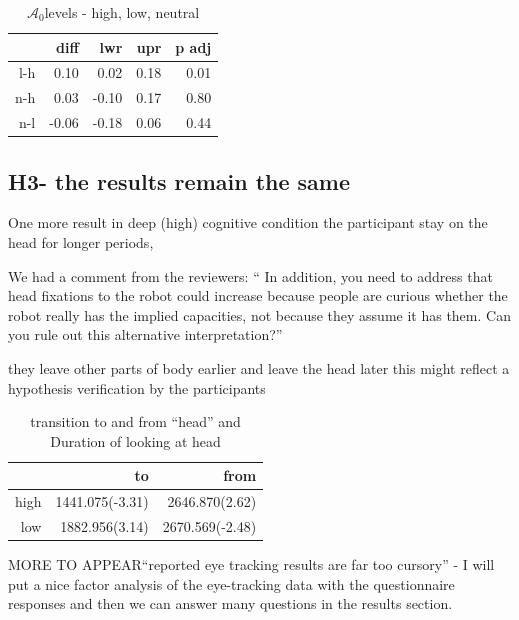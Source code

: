 \documentclass[lettersize, noapacite, twoside, HRI]{apa_HRI}
\newcommand{\anti}{{$\mathcal{A}_0$\xspace}}
\begin{document}
\begin{table}[ht]
\caption{\anti levels - high, low, neutral}
\centering
\begin{tabular}{rrrrr}
  \hline
 & diff & lwr & upr & p adj \\ 
  \hline
l-h & 0.10 & 0.02 & 0.18 & 0.01 \\ 
  n-h & 0.03 & -0.10 & 0.17 & 0.80 \\ 
  n-l & -0.06 & -0.18 & 0.06 & 0.44 \\ 
   \hline
\end{tabular}
\end{table}


\subsection{H3- the results remain the same}

One more result in deep (high) cognitive condition the participant stay on the head for longer periods, 

We had a comment from the reviewers: 
`` In addition, you need to address that head fixations to the robot could increase because people are curious whether the robot really has the implied capacities, not because they assume it has them. Can you rule out this alternative interpretation?'' 

they leave other parts of body earlier and leave the head later this might reflect a hypothesis verification by the participants

\begin{table}[ht]
\caption{transition to and from ``head'' and Duration of looking at head}
\centering
\begin{tabular}{rrr}
  \hline
 & to & from \\ 
  \hline
high & 1441.075(-3.31) & 2646.870(2.62) \\ 
  low & 1882.956(3.14) & 2670.569(-2.48) \\ 
   \hline
\end{tabular}
\end{table}




MORE TO APPEAR``reported eye tracking results are far too cursory'' - I will put a nice factor analysis of the eye-tracking data with the questionnaire responses and then we can answer many questions in the results section. 




\pagebreak
\appendix
\end{document}
